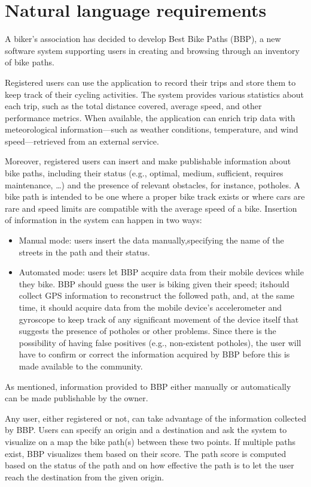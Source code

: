 \section{Natural language requirements}

A biker’s association has decided to develop Best Bike Paths (BBP), a new software system supporting users in creating and browsing through an inventory of bike paths.

Registered users can use the application to record their trips and store them to keep track of their cycling activities. The system provides various statistics about each trip, such as the total distance covered, average speed, and other performance metrics. When available, the application can enrich trip data with meteorological information—such as weather conditions, temperature, and wind speed—retrieved from an external service.

Moreover, registered users can insert and make publishable information about bike paths, including their status (e.g., optimal, medium, sufficient, requires maintenance, …) and the presence of relevant obstacles, for instance, potholes. A bike path is intended to be one where a proper bike track exists or where cars are rare and speed limits are compatible with the average speed of a bike. Insertion of information in the system can happen in two ways:
\begin{itemize}
    \item Manual mode: users insert the data manually,specifying the name of the streets in the path and their status.
    \item Automated mode: users let BBP acquire data from their mobile devices while they bike. BBP should guess the user is biking given their speed; itshould collect GPS information to reconstruct the followed path, and, at the same time, it should acquire data from the mobile device’s accelerometer and gyroscope to keep track of any significant movement of the device itself that suggests the presence of potholes or other problems. Since there is the possibility of having false positives (e.g., non-existent potholes), the user will have to confirm or correct the information acquired by BBP before this is made available to the community.
\end{itemize}

As mentioned, information provided to BBP either manually or automatically can be made publishable by the owner.

Any user, either registered or not, can take advantage of the information collected by BBP. Users can specify an origin and a destination and ask the system to visualize on a map the bike path(s) between these two points. If multiple paths exist, BBP visualizes them based on their score. The path score is computed based on the status of the path and on how effective the path is to let the user reach the destination from the given origin.

